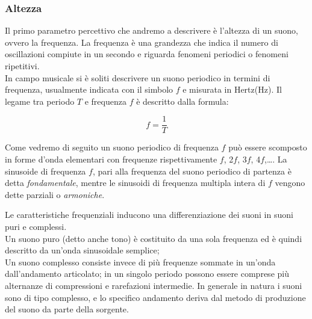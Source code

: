 \documentclass[12pt]{report}
\begin{document}
		\subsubsection{Altezza}
		\label{cap2sec1_1_2}
			Il primo parametro percettivo che andremo a descrivere è l'altezza di un suono, ovvero la frequenza. La frequenza è una grandezza che indica il numero di oscillazioni compiute in un secondo e  riguarda fenomeni periodici o fenomeni ripetitivi.\\
In campo musicale si è soliti descrivere un suono periodico in termini di frequenza, usualmente indicata con il simbolo $f$ e misurata in Hertz(Hz). Il legame tra periodo $T$ e frequenza $f$ è descritto dalla formula:

$$ f = \frac{1}{T} $$

Come vedremo di seguito un suono periodico di frequenza $f$ può essere scomposto in forme d'onda elementari con frequenze rispettivamente $f$, 2$f$, 3$f$, 4$f$,\dots. La sinusoide di frequenza $f$, pari alla frequenza del suono periodico di partenza è detta {\itshape fondamentale}, mentre le sinusoidi di frequenza multipla intera di $f$ vengono dette parziali o {\itshape armoniche}.

Le caratteristiche frequenziali inducono una differenziazione dei suoni in suoni puri e complessi.\\
Un suono puro (detto anche tono) è costituito da una sola frequenza ed è quindi descritto da un'onda sinusoidale semplice;\\
Un suono complesso consiste invece di più frequenze sommate in un'onda dall'andamento articolato; in un singolo periodo possono essere comprese più alternanze di compressioni e rarefazioni intermedie. In generale in natura i suoni sono di tipo complesso, e lo specifico andamento deriva dal metodo di produzione del suono da parte della sorgente.
\end{document}

